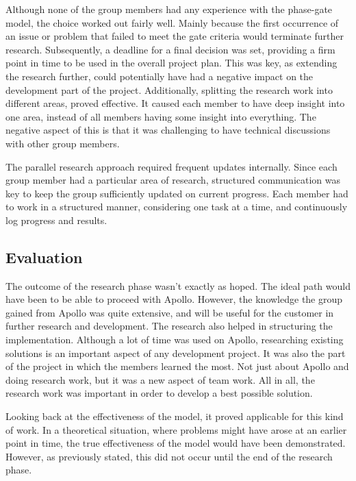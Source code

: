 Although none of the group members had any experience with the phase-gate model, the choice worked out fairly well. Mainly because the first occurrence of an issue or problem that failed to meet the gate criteria would terminate further research. Subsequently, a deadline for a final decision was set, providing a firm point in time to be used in the overall project plan. This was key, as extending the research further, could potentially have had a negative impact on the development part of the project. Additionally, splitting the research work into different areas, proved effective. It caused each member to have deep insight into one area, instead of all members having some insight into everything. The negative aspect of this is that it was challenging to have technical discussions with other group members.

The parallel research approach required frequent updates internally. Since each group member had a particular area of research, structured communication was key to keep the group sufficiently updated on current progress. Each member had to work in a structured manner, considering one task at a time, and continuously log progress and results.

\subsection{Evaluation}
\label{subsec:project_evaluation-research_phase-evaluation}

The outcome of the research phase wasn't exactly as hoped. The ideal path would have been to be able to proceed with Apollo. However, the knowledge the group gained from Apollo was quite extensive, and will be useful for the customer in further research and development. The research also helped in structuring the implementation. Although a lot of time was used on Apollo, researching existing solutions is an important aspect of any development project. It was also the part of the project in which the members learned the most. Not just about Apollo and doing research work, but it was a new aspect of team work. All in all, the research work was important in order to develop a best possible solution.

Looking back at the effectiveness of the model, it proved applicable for this kind of work. In a theoretical situation, where problems might have arose at an earlier point in time, the true effectiveness of the model would have been demonstrated. However, as previously stated, this did not occur until the end of the research phase.

